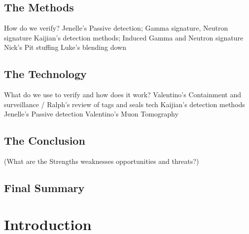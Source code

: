 \documentclass[twoside,titlepage,11pt,twocolumn,a4paper]{article}
\begin{document}
\subsection*{The Methods}
How do we verify?
Jenelle's Passive detection; Gamma signature, Neutron signature
Kaijian's detection methods; Induced Gamma and Neutron signature 
Nick's Pit stuffing
Luke's blending down
\subsection*{The Technology}
What do we use to verify and how does it work?
Valentino's Containment and surveillance / Ralph's review of tags and seals tech
Kaijian's detection methods
Jenelle's Passive detection
Valentino's Muon Tomography 

\subsection*{The Conclusion}
(What are the Strengths weaknesses opportunities and threats?)
\subsection*{Final Summary}

\newpage
\tableofcontents
\twocolumn

\section{Introduction}
\end{document}

